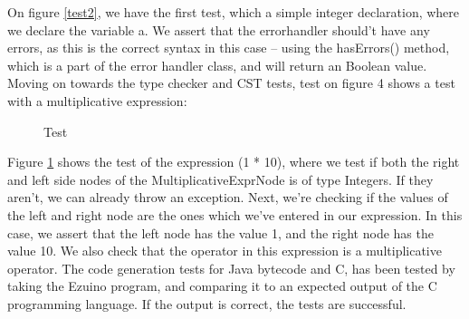 On figure \ref{test2}, we have the first test, which a simple integer declaration, where we declare the variable a. We assert that the errorhandler should’t have any errors, as this is the correct syntax in this case – using the hasErrors() method, which is a part of the error handler class, and will return an Boolean value. 
Moving on towards the type checker and CST tests, test on figure 4 shows a test with a multiplicative expression: 
\begin{figure}[H]
\centering
{}
\caption{Test}
\label{test3}
\end{figure}
Figure \ref{test3} shows the test of the expression (1 * 10), where we test if both the right and left side nodes of the MultiplicativeExprNode is of type Integers. If they aren’t, we can already throw an exception. Next, we’re checking if the values of the left and right node are the ones which we’ve entered in our expression. In this case, we assert that the left node has the value 1, and the right node has the value 10.  We also check that the operator in this expression is a multiplicative operator.
The code generation tests for Java bytecode and C, has been tested by taking the Ezuino program, and comparing it to an expected output of the C programming language. If the output is correct, the tests are successful.  
